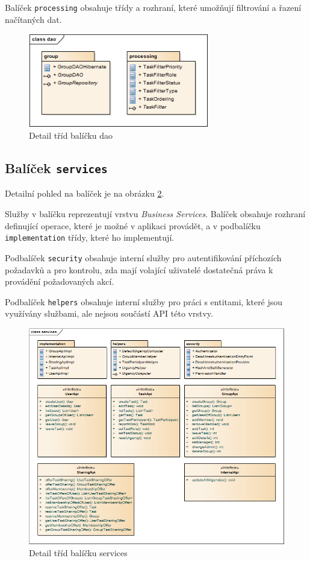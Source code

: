 \documentclass[thesis=B,czech]{FITthesis}[2012/06/26]
\begin{document}
			Balíček \texttt{processing} obsahuje třídy a rozhraní, které umožňují filtrování a řazení načítaných dat.
			
			\begin{figure}\centering
				\includegraphics[width=0.7\textwidth]{ea-diagrams/packages/dao.png}
				\caption[Balíček dao]{Detail tříd balíčku dao}
				\label{diagram:package-dao}
			\end{figure}
				
		\subsection{Balíček \texttt{services}}
			Detailní pohled na balíček je na obrázku \ref{diagram:package-services}. 
			
			Služby v balíčku reprezentují vrstvu \textit{Business Services}. Balíček obsahuje rozhraní definující operace, které je možné v aplikaci provádět, a v podbalíčku \texttt{implementation} třídy, které ho implementují.
			
			Podbalíček \texttt{security} obsahuje interní služby pro autentifikování příchozích požadavků a pro kontrolu, zda mají volající uživatelé dostatečná práva k provádění požadovaných akcí.
			
			Podbalíček \texttt{helpers} obsahuje interní služby pro práci s entitami, které jsou využívány službami, ale nejsou součástí API této vrstvy.
			
			\begin{figure}\centering
				\includegraphics[width=1\textwidth]{ea-diagrams/packages/services.png}
				\caption[Balíček services]{Detail tříd balíčku services}
				\label{diagram:package-services}
			\end{figure}
			
\end{document}
